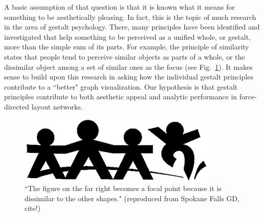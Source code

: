 \documentclass[12pt, twocolumn]{article}
\begin{document}
A basic assumption of that question is that it is known what it means for something to be aesthetically pleasing. 
In fact, this is the topic of much research in the area of gestalt psychology. 
There, many principles have been identified and investigated that help something to be perceived as a unified whole, or gestalt, more than the simple sum of its parts. 
For example, the principle of similarity states that people tend to perceive similar objects as parts of a whole, or the dissimilar object among a set of similar ones as the focus (see Fig.~\ref{fig:sim}). 
It makes sense to build upon this research in asking how the individual gestalt principles contribute to a ``better" graph visualization.
Our hypothesis is that gestalt principles contribute to both aesthetic appeal and analytic performance in force-directed layout networks.
\begin{figure}[b]
	\caption{\small ``The figure on the far right becomes a focal point because it is dissimilar to the other shapes." (reproduced from Spokane Falls GD, cite!)}
	\label{fig:sim}
	\includegraphics[width=.9\linewidth]{anomaly01.png}
\end{figure}
\\
\end{document}
